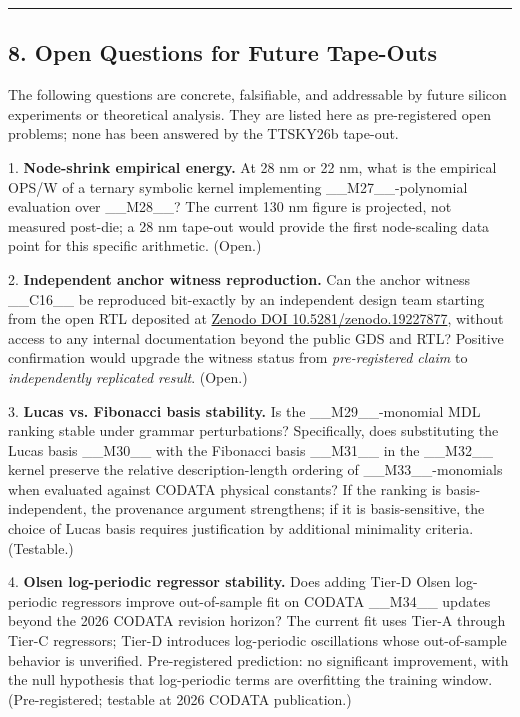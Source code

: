 \noindent\rule{\textwidth}{0.4pt}

\subsection{8. Open Questions for Future Tape-Outs}

The following questions are concrete, falsifiable, and addressable by future silicon experiments or theoretical analysis. They are listed here as pre-registered open problems; none has been answered by the TTSKY26b tape-out.

1. \textbf{Node-shrink empirical energy.} At 28 nm or 22 nm, what is the empirical OPS/W of a ternary symbolic kernel implementing \_\_M27\_\_-polynomial evaluation over \_\_M28\_\_? The current 130 nm figure is projected, not measured post-die; a 28 nm tape-out would provide the first node-scaling data point for this specific arithmetic. (Open.)

2. \textbf{Independent anchor witness reproduction.} Can the anchor witness \_\_C16\_\_ be reproduced bit-exactly by an independent design team starting from the open RTL deposited at \href{https://doi.org/10.5281/zenodo.19227877}{Zenodo DOI 10.5281/zenodo.19227877}, without access to any internal documentation beyond the public GDS and RTL? Positive confirmation would upgrade the witness status from \textit{pre-registered claim} to \textit{independently replicated result}. (Open.)

3. \textbf{Lucas vs. Fibonacci basis stability.} Is the \_\_M29\_\_-monomial MDL ranking stable under grammar perturbations? Specifically, does substituting the Lucas basis \_\_M30\_\_ with the Fibonacci basis \_\_M31\_\_ in the \_\_M32\_\_ kernel preserve the relative description-length ordering of \_\_M33\_\_-monomials when evaluated against CODATA physical constants? If the ranking is basis-independent, the provenance argument strengthens; if it is basis-sensitive, the choice of Lucas basis requires justification by additional minimality criteria. (Testable.)

4. \textbf{Olsen log-periodic regressor stability.} Does adding Tier-D Olsen log-periodic regressors improve out-of-sample fit on CODATA \_\_M34\_\_ updates beyond the 2026 CODATA revision horizon? The current fit uses Tier-A through Tier-C regressors; Tier-D introduces log-periodic oscillations whose out-of-sample behavior is unverified. Pre-registered prediction: no significant improvement, with the null hypothesis that log-periodic terms are overfitting the training window. (Pre-registered; testable at 2026 CODATA publication.)

